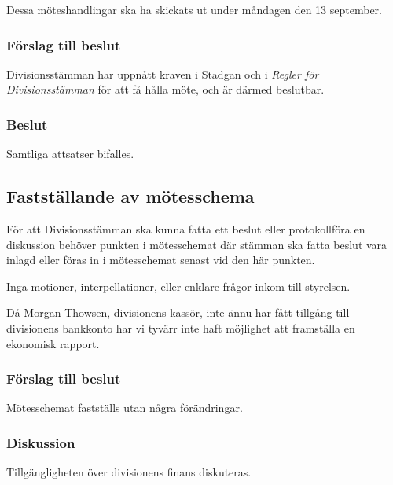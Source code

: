 \documentclass[protokoll]{dvd}
\begin{document}
Dessa möteshandlingar ska ha skickats ut under måndagen den 13 september.

\subsubsection*{Förslag till beslut}

\begin{attsatser}
	\item Divisionsstämman har uppnått kraven i Stadgan och i \emph{Regler för Divisionsstämman} för att få hålla möte, och är därmed beslutbar.
\end{attsatser}

\subsubsection{Beslut}
\begin{attsatser}
	\item Samtliga attsatser bifalles.
\end{attsatser}

\subsection{Fastställande av mötesschema}

För att Divisionsstämman ska kunna fatta ett beslut eller protokollföra en diskussion behöver punkten i mötesschemat där stämman ska fatta beslut vara inlagd eller föras in i mötesschemat senast vid den här punkten.

Inga motioner, interpellationer, eller enklare frågor inkom till styrelsen.

Då Morgan Thowsen, divisionens kassör, inte ännu har fått tillgång till divisionens bankkonto har vi tyvärr inte haft möjlighet att framställa en ekonomisk rapport.

\subsubsection*{Förslag till beslut}

\begin{attsatser}
	\item Mötesschemat fastställs utan några förändringar.
\end{attsatser}

\subsubsection{Diskussion}
Tillgängligheten över divisionens finans diskuteras.
	
\end{document}
